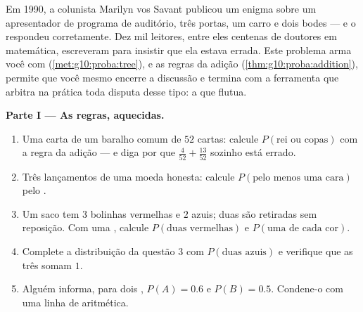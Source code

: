 \begin{problem}
\label{pb:g10:proba:1}
Em 1990, a colunista Marilyn vos Savant publicou um enigma sobre um
apresentador de programa de auditório, três portas, um carro e dois
bodes --- e o respondeu corretamente. Dez mil leitores, entre eles
centenas de doutores em matemática, escreveram para insistir que
ela estava errada. Este problema arma você com 
(\cref{met:g10:proba:tree}),  e as regras da adição
(\cref{thm:g10:proba:addition}), permite que você mesmo encerre a
discussão e termina com a ferramenta que arbitra na prática toda
disputa desse tipo: a  que flutua.

\medskip
\noindent\textbf{Parte I --- As regras, aquecidas.}
\begin{enumerate}
  \item Uma carta de um baralho comum de $52$ cartas: calcule
        $P(\text{rei ou copas})$ com a regra da adição --- e diga
        por que $\frac{4}{52} + \frac{13}{52}$ sozinho está
        errado.
  \item Três lançamentos de uma moeda honesta: calcule
        $P(\text{pelo menos uma cara})$ pelo .
  \item Um saco tem $3$ bolinhas vermelhas e $2$ azuis; duas são
        retiradas sem reposição. Com uma , calcule
        $P(\text{duas vermelhas})$ e
        $P(\text{uma de cada cor})$.
  \item Complete a distribuição da questão 3 com
        $P(\text{duas azuis})$ e verifique que as três
         somam $1$.
  \item Alguém informa, para dois  \emph{},
        $P(A) = 0.6$ e $P(B) = 0.5$. Condene-o com uma linha de
        aritmética.
\end{enumerate}


\end{problem}
